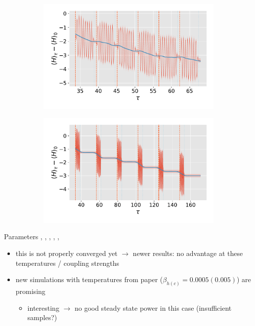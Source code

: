 \documentclass[10pt, aspectratio=169]{beamer}
\begin{document}
\begin{frame}
  \begin{figure}
    \centering
    \begin{subfigure}[t]{.49\linewidth}
      \centering
      \includegraphics[width=\linewidth]{anti_zeno/anti_zeno_without_cool}
      \caption{}
    \end{subfigure}
    \begin{subfigure}[t]{.49\linewidth}
      \centering
      \includegraphics[width=\linewidth]{anti_zeno/anti_zeno_with_cool}
      \caption{
        }
    \end{subfigure}
  \end{figure}
  \begin{exampleblock}{Parameters}
    {, , ,
      , , }
  \end{exampleblock}
  \begin{itemize}
  \item this is not properly converged yet \(\rightarrow\) newer
    results: no advantage at these temperatures / coupling strengths
  \item new simulations with temperatures from paper
    (\(β_{h(c)}=0.0005(0.005)\)) are promising
    \begin{itemize}
    \item interesting \(\rightarrow\) no good steady state power in this case
      (insufficient samples?)
    \end{itemize}
  \end{itemize}
\end{frame}
\end{document}

